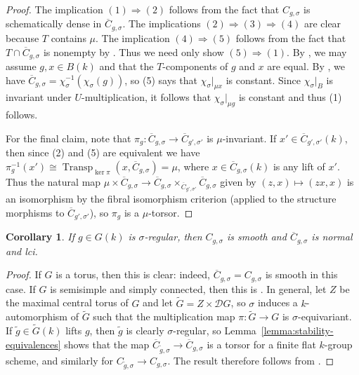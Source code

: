 \documentclass[11pt,reqno]{amsart}
\newtheorem{cor}[theorem]{Corollary}
\theoremstyle{definition}
\newcommand{\sD}{{\mathscr D}}
\DeclareMathOperator{\Transp}{Transp}
\newcommand{\ov}[1]{\overline{#1}}
\begin{document}
\begin{proof}
    The implication $(1) \Rightarrow (2)$ follows from the fact that $C_{g,\sigma}$ is schematically dense in $\ov{C}_{g,\sigma}$. The implications $(2) \Rightarrow (3) \Rightarrow (4)$ are clear because $T$ contains $\mu$. The implication $(4) \Rightarrow (5)$ follows from the fact that $T \cap \ov{C}_{g,\sigma}$ is nonempty by \cite[Lemma 5(iii)]{Springer-twisted}. Thus we need only show $(5) \Rightarrow (1)$. By \cite[Lemma 5(i)]{Springer-twisted}, we may assume $g, x \in B(k)$ and that the $T$-components of $g$ and $x$ are equal. By \cite[Corollary 5.3.5]{Xiao-Zhu}, we have $\ov{C}_{g,\sigma} = \chi_\sigma^{-1}(\chi_\sigma(g))$, so (5) says that $\chi_\sigma|_{\mu x}$ is constant. Since $\chi_\sigma|_B$ is invariant under $U$-multiplication, it follows that $\chi_\sigma|_{\mu g}$ is constant and thus (1) follows.

    For the final claim, note that $\pi_g\colon \ov{C}_{g,\sigma} \to \ov{C}_{g',\sigma'}$ is $\mu$-invariant. If $x' \in \ov{C}_{g',\sigma'}(k)$, then since (2) and (5) are equivalent we have $\pi_g^{-1}(x') \cong \Transp_{\ker \pi}(x, \ov{C}_{g,\sigma}) = \mu$, where $x \in \ov{C}_{g,\sigma}(k)$ is any lift of $x'$. Thus the natural map $\mu \times \ov{C}_{g,\sigma} \to \ov{C}_{g,\sigma} \times_{\ov{C}_{g',\sigma'}} \ov{C}_{g,\sigma}$ given by $(z, x) \mapsto (zx, x)$ is an isomorphism by the fibral isomorphism criterion (applied to the structure morphisms to $\ov{C}_{g',\sigma'}$), so $\pi_g$ is a $\mu$-torsor.
\end{proof}

\begin{cor}\label{cor:normal}
	If $g \in G(k)$ is $\sigma$-regular, then $C_{g,\sigma}$ is smooth and $\ov{C}_{g,\sigma}$ is normal and lci.
\end{cor}

\begin{proof}
	If $G$ is a torus, then this is clear: indeed, $\ov{C}_{g,\sigma} = C_{g,\sigma}$ is smooth in this case. If $G$ is semisimple and simply connected, then this is \cite[Corollary 5.3.3, Corollary 5.3.5]{Xiao-Zhu}. In general, let $Z$ be the maximal central torus of $G$ and let $\widetilde{G} = Z \times \sD G$, so $\sigma$ induces a $k$-automorphism of $\widetilde{G}$ such that the multiplication map $\pi\colon \widetilde{G} \to G$ is $\sigma$-equivariant. If $\widetilde{g} \in \widetilde{G}(k)$ lifts $g$, then $\widetilde{g}$ is clearly $\sigma$-regular, so Lemma~\ref{lemma:stability-equivalences} shows that the map $\ov{C}_{\widetilde{g},\sigma} \to \ov{C}_{g,\sigma}$ is a torsor for a finite flat $k$-group scheme, and similarly for $C_{\widetilde{g},\sigma} \to C_{g, \sigma}$. The result therefore follows from \cite[Corollary 23.3, Theorem 23.7, Corollary 23.9]{Matsumura}.
\end{proof}
\end{document}

